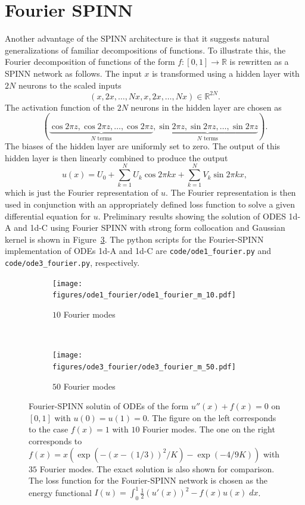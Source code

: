 \documentclass[12pt]{article}
\newcommand{\code}[1]{\lstinline{#1}}
\begin{document}
\section{Fourier SPINN}
\label{app:fourier_spinn}

Another advantage of the SPINN architecture is that it suggests natural generalizations of familiar decompositions of functions. To illustrate this, the Fourier decomposition of functions of the form $f:[0,1] \to \mathbb{R}$ is rewritten as a SPINN network as follows. The input $x$ is transformed using a hidden layer with $2N$ neurons to the scaled inputs
\begin{displaymath}
(x, 2x, \ldots, Nx, x, 2x, \ldots, Nx) \in \mathbb{R}^{2N}.
\end{displaymath}
The activation function of the $2N$ neurons in the hidden layer are chosen as
\begin{displaymath}
(\underbrace{\cos 2\pi z, \cos 2\pi z, \ldots, \cos 2\pi z}_{\text{$N$ terms}}, \underbrace{\sin 2\pi z, \sin 2\pi z, \ldots, \sin 2\pi z}_{\text{$N$ terms}}).
\end{displaymath}
The biases of the hidden layer are uniformly set to zero. The output of this hidden layer is then linearly combined to produce the output
\begin{displaymath}
u(x) = U_0 + \sum_{k=1}^N U_k \cos 2\pi kx + \sum_{k=1}^N V_k \sin 2\pi kx,
\end{displaymath}
which is just the Fourier representation of $u$. The Fourier representation is then used in conjunction with an appropriately defined loss function to solve a given differential equation for $u$. Preliminary results showing the solution of ODES 1d-A and 1d-C using Fourier SPINN with strong form collocation and Gaussian kernel is shown in Figure~\ref{fig:fourier_spinn_1d}. The python scripts for the Fourier-SPINN implementation of ODEs 1d-A and 1d-C are \code{code/ode1_fourier.py} and \code{code/ode3_fourier.py}, respectively.

\begin{figure}
\begin{subfigure}{0.5\textwidth}
\texttt{[image: figures/ode1\_fourier/ode1\_fourier\_m\_10.pdf]}
\caption{$10$ Fourier modes}
\label{fig:fourier_spinn_1d_basic}
\end{subfigure}
~
\begin{subfigure}{0.5\textwidth}
\texttt{[image: figures/ode3\_fourier/ode3\_fourier\_m\_50.pdf]}
\caption{$50$ Fourier modes}
\label{fig:fourier_spinn_1d_bump}
\end{subfigure}
\caption{Fourier-SPINN solutin of ODEs of the form $u''(x) + f(x) = 0$ on $[0,1]$ with $u(0) = u(1) = 0$. The figure on the left corresponds to the case $f(x) = 1$ with $10$ Fourier modes. The one on the right corresponds to $f(x) = x(\exp (-(x - (1/3))^2/K) - \exp (-4/9K))$ with $35$ Fourier modes. The exact solution is also shown for comparison. The loss function for the Fourier-SPINN network is chosen as the energy functional $I(u) = \int_0^1 \frac{1}{2}(u'(x))^2 - f(x)u(x) \; dx$.}
\label{fig:fourier_spinn_1d}
\end{figure}
\end{document}
